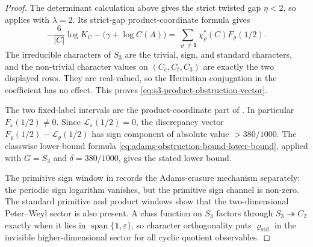 \begin{proof}
  The determinant calculation above gives the strict twisted gap
  \(\eta<2\), so  applies with
  \(\lambda=2\).  Its strict-gap product-coordinate formula gives
  \[
    -\frac{6}{|C|}\log K_C-\bigl(\gamma+\log C(A)\bigr)
    =
    \sum_{\varrho\ne\mathbf1}\chi_\varrho^\ast(C)F_\varrho(1/2).
  \]
  The irreducible characters of \(S_3\) are the trivial, sign, and standard
  characters, and the non-trivial character values on
  \((C_e,C_t,C_3)\) are exactly the two displayed rows.  They are real-valued,
  so the Hermitian conjugation in the coefficient has no effect.  This proves
  \eqref{eq:s3-product-obstruction-vector}.

  The two fixed-label intervals are the product-coordinate part of
  .  In particular
  \(F_\varepsilon(1/2)\ne0\).  Since
  \(\mathcal L_\varepsilon(1/2)=0\), the discrepancy vector
  \(F_\varrho(1/2)-\mathcal L_\varrho(1/2)\) has sign component of absolute
  value \(>380/1000\).  The classwise lower-bound formula
  \eqref{eq:adams-obstruction-bound-lower-bound}, applied with
  \(G=S_3\) and \(\delta=380/1000\), gives the stated lower bound.

  The primitive sign window in 
  records the Adams-erasure mechanism separately: the periodic sign logarithm
  vanishes, but the primitive sign channel is non-zero.  The standard
  primitive and product windows show that the two-dimensional Peter--Weyl
  sector is also present.  A class function on \(S_3\) factors through
  \(S_3\twoheadrightarrow C_2\) exactly when it lies in
  \(\operatorname{span}\{\mathbf1,\varepsilon\}\), so character orthogonality
  puts \(\varrho_{\mathrm{std}}\) in the invisible higher-dimensional sector
  for all cyclic quotient observables.
\end{proof}
